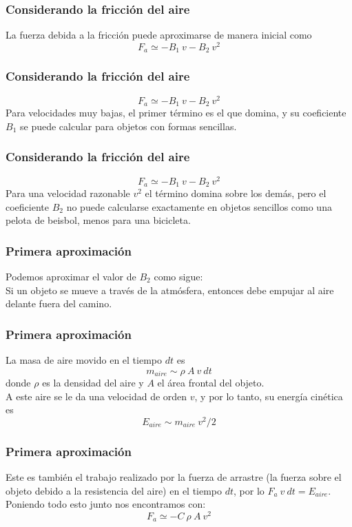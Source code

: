 \begin{frame}
\frametitle{Considerando la fricción del aire}
La fuerza debida a la fricción puede aproximarse de manera inicial como
\begin{equation}\label{EqFfriccion}
F_{a} \simeq - B_{1} \: v - B_{2} \: v^{2}
\end{equation}
\end{frame}
\begin{frame}
\frametitle{Considerando la fricción del aire}
\begin{equation*}
F_{a} \simeq - B_{1} \: v - B_{2} \: v^{2}
\end{equation*}
Para velocidades muy bajas, el primer término es el que domina, y su coeficiente $B_{1}$ se puede calcular para objetos con formas sencillas.
\end{frame}
\begin{frame}
\frametitle{Considerando la fricción del aire}
\begin{equation*}
F_{a} \simeq - B_{1} \: v - B_{2} \: v^{2}
\end{equation*}
Para una velocidad razonable $v^{2}$ el término domina sobre los demás, pero el coeficiente $B_{2}$ no puede calcularse exactamente en objetos sencillos como una pelota de beisbol, menos para una bicicleta.
\end{frame}
\begin{frame}
\frametitle{Primera aproximación}
Podemos aproximar el valor de $B_{2}$ como sigue:
\\
\medskip
Si un objeto se mueve a través de la atmósfera, entonces debe empujar al aire delante fuera del camino.
\end{frame}
\begin{frame}
\frametitle{Primera aproximación}
La masa de aire movido en el tiempo $dt$ es
\[m_{aire} \sim \rho \: A \: v \: dt \]
donde $\rho$ es la densidad del aire y $A$ el área frontal del objeto. 
\\
\bigskip
\pause
A este aire se le da una velocidad de orden $v$, y por lo tanto, su energía cinética es
\[E_{aire} \sim m_{aire} \: v^{2} /2 \]
\end{frame}
\begin{frame}
\frametitle{Primera aproximación}
Este es también el trabajo realizado por la fuerza de arrastre (la fuerza sobre el objeto debido a la resistencia del aire) en el tiempo $dt$, por lo $F_{a} \: v \: dt = E_{aire}$.
\\
\bigskip
Poniendo todo esto junto nos encontramos con:
\[ F_{a} \simeq - C \: \rho \: A \: v^{2} \]
\end{frame}
